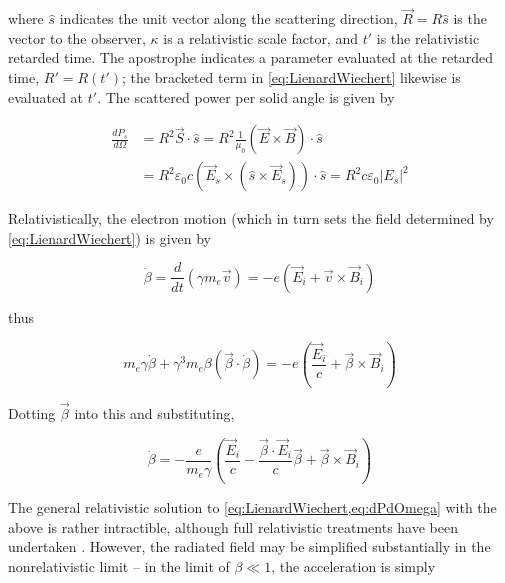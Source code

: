 \noindent where $\hat{s}$ indicates the unit vector along the scattering direction, $\vec{R} = R\hat{s}$ is the vector to the observer, $\kappa$ is a relativistic scale factor, and $t'$ is the relativistic retarded time.  The apostrophe indicates a parameter evaluated at the retarded time, \ie $R' = R(t')$; the bracketed term in \cref{eq:LienardWiechert} likewise is evaluated at $t'$.  The scattered power per solid angle is given by

\begin{equation}\label{eq:dPdOmega}
 \begin{aligned}
  \frac{dP_s}{d\Omega} &= R^2 \vec{S}\cdot\hat{s} = R^2 \frac{1}{\mu_0} \left(\vec{E} \times \vec{B}\right)\cdot\hat{s}\\
  &= R^2 \varepsilon_0 c \left(\vec{E}_s \times \left(\hat{s} \times \vec{E}_s\right)\right) \cdot \hat{s} = R^2 c \varepsilon_0 \left|E_s\right|^2
 \end{aligned}
\end{equation}

\noindent Relativistically, the electron motion (which in turn sets the field determined by \cref{eq:LienardWiechert}) is given by

\begin{equation}\label{eq:betadot}
 \dot{\beta} = \frac{d}{dt}\left(\gamma m_e \vec{v}\right) = -e\left(\vec{E}_i + \vec{v} \times \vec{B}_i\right)
\end{equation}

\noindent thus

\begin{equation}\label{eq:betadot2}
 m_e \gamma \dot{\beta} + \gamma^3 m_e \beta \left(\vec{\beta}\cdot\dot{\beta}\right) = -e \left(\frac{\vec{E}_i}{c} + \vec{\beta}\times\vec{B}_i\right)
\end{equation}

\noindent Dotting $\vec{\beta}$ into this and substituting,

\begin{equation}\label{eq:betadot3}
 \dot{\beta} = -\frac{e}{m_e \gamma} \left( \frac{\vec{E}_i}{c} - \frac{\vec{\beta}\cdot\vec{E}_i}{c} \vec{\beta} + \vec{\beta} \times \vec{B}_i \right)
\end{equation}

\noindent The general relativistic solution to \cref{eq:LienardWiechert,eq:dPdOmega} with the above is rather intractible, although full relativistic treatments have been undertaken \cite{Sheffield1972,Matoba1978,Selden1980,Naito1993}.  However, the radiated field may be simplified substantially in the nonrelativistic limit -- in the limit of $\beta \ll 1$, the acceleration is simply

